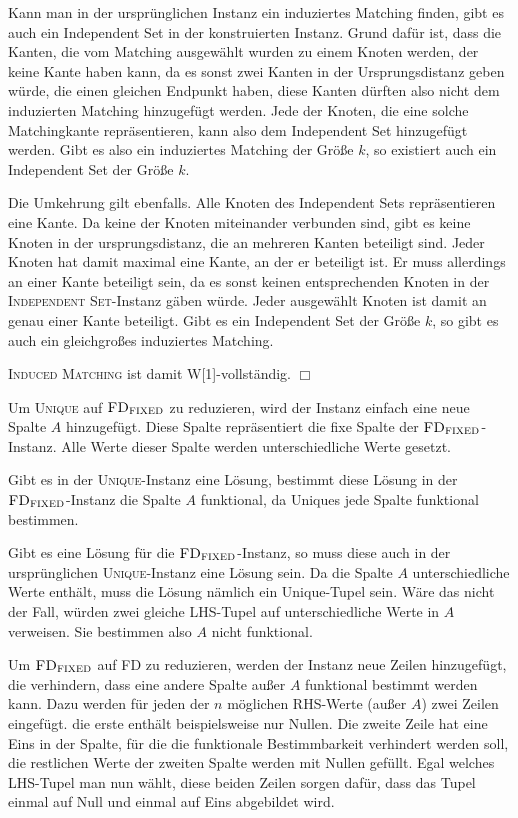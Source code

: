 Kann man in der ursprünglichen Instanz ein induziertes Matching finden, gibt es auch ein Independent Set in der konstruierten Instanz. Grund dafür ist, dass die Kanten, die vom Matching ausgewählt wurden zu einem Knoten werden, der keine Kante haben kann, da es sonst zwei Kanten in der Ursprungsdistanz geben würde, die einen gleichen Endpunkt haben, diese Kanten dürften also nicht dem induzierten Matching hinzugefügt werden. Jede der Knoten, die eine solche Matchingkante repräsentieren, kann also dem Independent Set hinzugefügt werden. Gibt es also ein induziertes Matching der Größe $k$, so existiert auch ein Independent Set der Größe $k$.

Die Umkehrung gilt ebenfalls. Alle Knoten des Independent Sets repräsentieren eine Kante. Da keine der Knoten miteinander verbunden sind, gibt es keine Knoten in der ursprungsdistanz, die an mehreren Kanten beteiligt sind. Jeder Knoten hat damit maximal eine Kante, an der er beteiligt ist. Er muss allerdings an einer Kante beteiligt sein, da es sonst keinen entsprechenden Knoten in der \textsc{Independent Set}-Instanz gäben würde. Jeder ausgewählt Knoten ist damit an genau einer Kante beteiligt. Gibt es ein Independent Set der Größe $k$, so gibt es auch ein gleichgroßes induziertes Matching.

\textsc{Induced Matching} ist damit W[1]-vollständig. \hfill $\Box$

\subexercise
Um \textsc{Unique} auf $\textsc{FD}_{\textsc{FIXED}}$ zu reduzieren, wird der Instanz einfach eine neue Spalte $A$ hinzugefügt. Diese Spalte repräsentiert die fixe Spalte der $\textsc{FD}_{\textsc{FIXED}}$-Instanz. Alle Werte dieser Spalte werden unterschiedliche Werte gesetzt.

Gibt es in der \textsc{Unique}-Instanz eine Lösung, bestimmt diese Lösung in der $\textsc{FD}_{\textsc{FIXED}}$-Instanz die Spalte $A$ funktional, da Uniques jede Spalte funktional bestimmen. 

Gibt es eine Lösung für die $\textsc{FD}_{\textsc{FIXED}}$-Instanz, so muss diese auch in der ursprünglichen \textsc{Unique}-Instanz eine Lösung sein. Da die Spalte $A$ unterschiedliche Werte enthält, muss die Lösung nämlich ein Unique-Tupel sein. Wäre das nicht der Fall, würden zwei gleiche LHS-Tupel auf unterschiedliche Werte in $A$ verweisen. Sie bestimmen also $A$ nicht funktional.

\subexercise
Um $\textsc{FD}_{\textsc{FIXED}}$ auf \textsc{FD} zu reduzieren, werden der Instanz neue Zeilen hinzugefügt, die verhindern, dass eine andere Spalte außer $A$ funktional bestimmt werden kann. Dazu werden für jeden der $n$ möglichen RHS-Werte (außer $A$) zwei Zeilen eingefügt. die erste enthält beispielsweise nur Nullen. Die zweite Zeile hat eine Eins in der Spalte, für die die funktionale Bestimmbarkeit verhindert werden soll, die restlichen Werte der zweiten Spalte werden mit Nullen gefüllt. Egal welches LHS-Tupel man nun wählt, diese beiden Zeilen sorgen dafür, dass das Tupel einmal auf Null und einmal auf Eins abgebildet wird.

